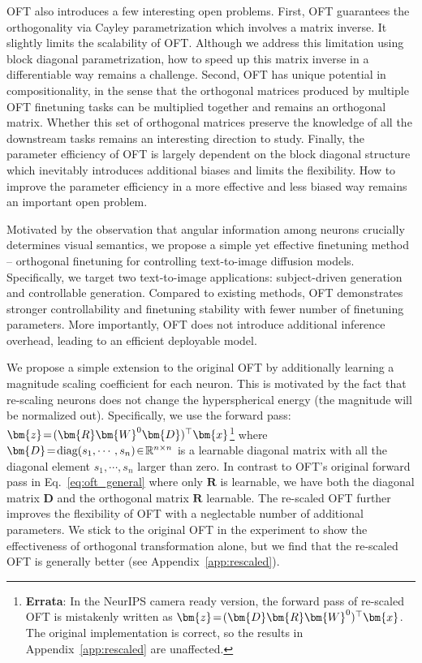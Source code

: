 \begin{itemize}[leftmargin=*,nosep]
OFT also introduces a few interesting open problems. First, OFT guarantees the orthogonality via Cayley parametrization which involves a matrix inverse. It slightly limits the scalability of OFT. Although we address this limitation using block diagonal parametrization, how to speed up this matrix inverse in a differentiable way remains a challenge. Second, OFT has unique potential in compositionality, in the sense that the orthogonal matrices produced by multiple OFT finetuning tasks can be multiplied together and remains an orthogonal matrix. Whether this set of orthogonal matrices preserve the knowledge of all the downstream tasks remains an interesting direction to study. Finally, the parameter efficiency of OFT is largely dependent on the block diagonal structure which inevitably introduces additional biases and limits the flexibility. How to improve the parameter efficiency in a more effective and less biased way remains an important open problem.

Motivated by the observation that angular information among neurons crucially determines visual semantics, we propose a simple yet effective finetuning method – orthogonal finetuning for controlling text-to-image diffusion models. Specifically, we target two text-to-image applications: subject-driven generation and controllable generation. Compared to existing methods, OFT demonstrates stronger controllability and finetuning stability with fewer number of finetuning parameters. More importantly, OFT does not introduce additional inference overhead, leading to an efficient deployable model.

We propose a simple extension to the original OFT by additionally learning a magnitude scaling coefficient for each neuron. This is motivated by the fact that re-scaling neurons does not change the hyperspherical energy (the magnitude will be normalized out). Specifically, we use the forward pass: $\thickmuskip=2mu \medmuskip=2mu\bm{z}=(\bm{R}\bm{W}^0\bm{D})^\top\bm{x}$\footnote{\textbf{Errata}: In the NeurIPS camera ready version, the forward pass of re-scaled OFT is mistakenly written as $\thickmuskip=2mu \medmuskip=2mu\bm{z}=(\bm{D}\bm{R}\bm{W}^0)^\top\bm{x}$. The original implementation is correct, so the results in Appendix~\ref{app:rescaled} are unaffected.} where $\thickmuskip=2mu \medmuskip=2mu \bm{D}=\text{diag}(s_1,\cdots,s_n)\in\mathbb{R}^{n\times n}$ is a learnable diagonal matrix with all the diagonal element $s_1,\cdots,s_n$ larger than zero. In contrast to OFT's original forward pass in Eq.~\eqref{eq:oft_general} where only $\bm{R}$ is learnable, we have both the diagonal matrix $\bm{D}$ and the orthogonal matrix $\bm{R}$ learnable. The re-scaled OFT further improves the flexibility of OFT with a neglectable number of additional parameters. We stick to the original OFT in the experiment to show the effectiveness of orthogonal transformation alone, but we find that the re-scaled OFT is generally better (see Appendix~\ref{app:rescaled}).


\end{itemize}

